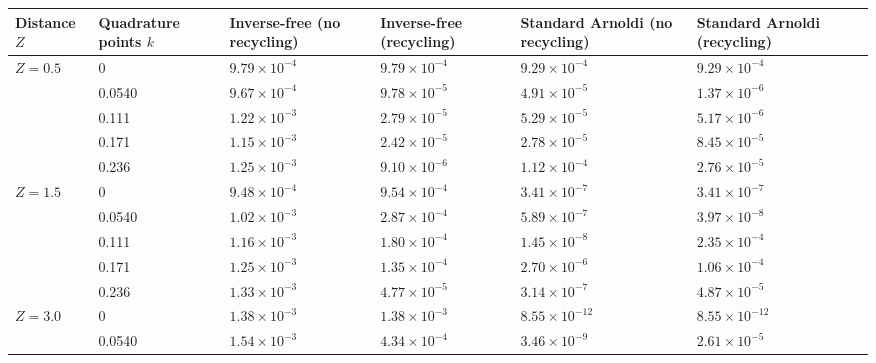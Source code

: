 \begin{table}[H]
    \centering
    \begin{tabular}{ |M{1.5cm}|M{1.7cm}|M{2.2cm} |M{2.2cm}|M{2.2cm}|M{3cm}|M{2.2cm}| } 
    \hline
    Distance $Z$ & Quadrature points $k$ &  Inverse-free (no recycling) & Inverse-free (recycling) & Standard Arnoldi (no recycling) & Standard Arnoldi (recycling)\\
    \hline
       & 0        & $9.79\times 10^{-4}$  & $9.79\times 10^{-4}$  &$9.29\times 10^{-4}$ &$9.29\times 10^{-4}$\\ 
                                   & 0.0540   & $9.67\times 10^{-4}$  & $9.78\times 10^{-5}$  &$4.91\times 10^{-5}$ &$1.37\times 10^{-6}$\\ 
                                   & 0.111    & $1.22\times 10^{-3}$  & $2.79\times 10^{-5}$  &$5.29\times 10^{-5}$ &$5.17\times 10^{-6}$\\ 
                                   & 0.171    & $1.15\times 10^{-3}$  & $2.42\times 10^{-5}$  &$2.78\times 10^{-5}$ &$8.45\times 10^{-5}$\\ 
                                   & 0.236    & $1.25\times 10^{-3}$  & $9.10\times 10^{-6}$  &$1.12\times 10^{-4}$ &$2.76\times 10^{-5}$\\ 
    \hline
    \hline
       & 0        & $9.48\times 10^{-4}$  & $9.54\times 10^{-4}$  &$3.41\times 10^{-7}$ &$3.41\times 10^{-7}$\\ 
                                   & 0.0540   & $1.02\times 10^{-3}$  & $2.87\times 10^{-4}$  &$5.89\times 10^{-7}$ &$3.97\times 10^{-8}$\\ 
                                   & 0.111    & $1.16\times 10^{-3}$  & $1.80\times 10^{-4}$  &$1.45\times 10^{-8}$ &$2.35\times 10^{-4}$\\ 
                                   & 0.171    & $1.25\times 10^{-3}$  & $1.35\times 10^{-4}$  &$2.70\times 10^{-6}$ &$1.06\times 10^{-4}$\\ 
                                   & 0.236    & $1.33\times 10^{-3}$  & $4.77\times 10^{-5}$  &$3.14\times 10^{-7}$ &$4.87\times 10^{-5}$\\ 
    \hline
    \hline
       & 0        & $1.38\times 10^{-3}$  & $1.38\times 10^{-3}$  &$8.55\times 10^{-12}$ &$8.55\times 10^{-12}$\\ 
                                   & 0.0540   & $1.54\times 10^{-3}$  & $4.34\times 10^{-4}$  &$3.46\times 10^{-9}$  &$2.61\times 10^{-5}$\\ 

\end{tabular}
\end{table}
